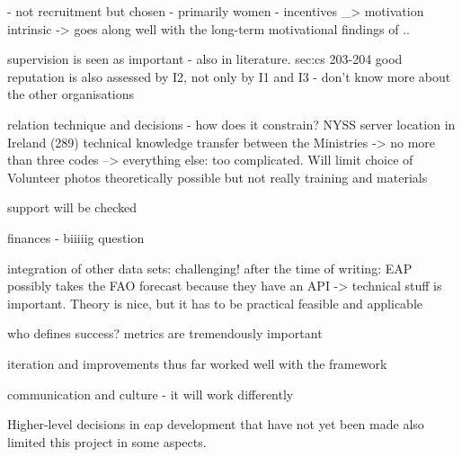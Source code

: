 - not recruitment but chosen - primarily women
- incentives _> motivation intrinsic -> goes along well with the long-term motivational findings of .. 


supervision is seen as important - also in literature. sec:cs 203-204
good reputation is also assessed by I2, not only by I1 and I3 - don't know more about the other organisations


relation technique and decisions - how does it constrain?
NYSS
server location in Ireland (289)
technical knowledge transfer between the Ministries
-> no more than three codes --> everything else: too complicated. Will limit choice of Volunteer
photos theoretically possible but not really
training and materials

support will be checked

finances - biiiiig question

integration of other data sets: challenging!
after the time of writing: EAP possibly takes the FAO forecast because they have an API -> technical stuff is important. Theory is nice, but it has to be practical feasible and applicable

who defines success? metrics are tremendously important

iteration and improvements thus far worked well with the framework

communication and culture - it will work differently


Higher-level decisions in \acrshort{eap} development that have not yet been made also limited this project in some aspects. 

